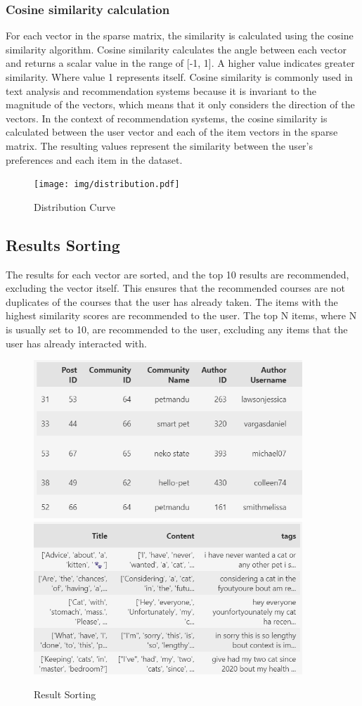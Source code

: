 \subsubsection{Cosine similarity calculation}
For each vector in the sparse matrix, the similarity is calculated using the cosine similarity algorithm. Cosine similarity calculates the angle between each vector and returns a scalar value in the range of [-1, 1]. A higher value indicates greater similarity. Where value 1 represents itself. Cosine similarity is commonly used in text analysis and recommendation systems because it is invariant to the magnitude of the vectors, which means that it only considers the direction of the vectors. In the context of recommendation systems, the cosine similarity is calculated between the user vector and each of the item vectors in the sparse matrix. The resulting values represent the similarity between the user's preferences and each item in the dataset.
\vspace{1cm}
\begin{figure}[ht]
\centering
\texttt{[image: img/distribution.pdf]} 
\caption{Distribution Curve}
\label{fig:system-overview}
\end{figure}

\newpage
\subsection{Results Sorting}
The results for each vector are sorted, and the top 10 results are recommended, excluding the vector itself. This ensures that the recommended courses are not duplicates of the courses that the user has already taken. The items with the highest similarity scores are recommended to the user. The top N items, where N is usually set to 10, are recommended to the user, excluding any items that the user has already interacted with.

\vspace{1cm}
\begin{figure}[ht]
  \centering
  
  \includegraphics[width=0.9\textwidth]{img/1.png}
  \centering
  \includegraphics[width=0.9\textwidth]{img/2.png}
  \caption{Result Sorting}
  \label{fig:matrix}
\end{figure}
